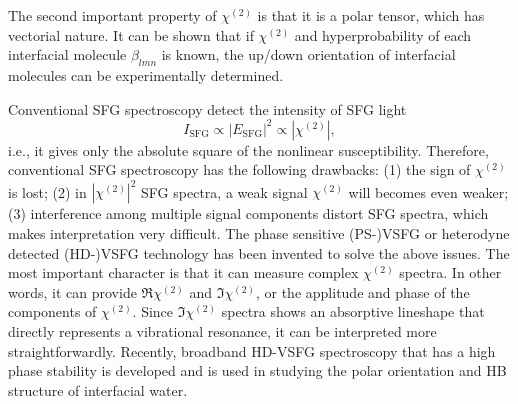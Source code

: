 %
The second important property of $\chi^{(2)}$ is that it is a polar tensor, which has vectorial nature.\cite{Nihonyanagi2013} 
It can be shown that if $\chi^{(2)}$ and hyperprobability of each interfacial molecule $\beta_{lmn}$ is known, 
the up/down orientation of interfacial molecules can be experimentally determined.

Conventional SFG spectroscopy detect the intensity of SFG light
\begin{equation}
I_{\text{SFG}}\propto |E_{\text{SFG}}|^2 \propto |\chi^{(2)}|,
\label{eq:sfg_intensity}
\end{equation}
i.e., it gives only the absolute square of the nonlinear susceptibility. Therefore, conventional SFG spectroscopy has the following drawbacks\cite{Nihonyanagi2013}:
(1) the sign of $\chi^{(2)}$ is lost; 
(2) in $|\chi^{(2)}|^2$ SFG spectra, a weak signal $\chi^{(2)}$  will becomes even weaker;
(3) interference among multiple signal components distort SFG spectra, which makes interpretation very difficult.
The phase sensitive (PS-)VSFG\cite{Ji2008} or heterodyne detected (HD-)VSFG technology has been invented to solve the above 
issues. The most important character is that it can measure complex $\chi^{(2)}$ spectra. In other words, it can provide $\Re \chi^{(2)}$ and $\Im \chi^{(2)}$,
or the applitude and phase of the components of $\chi^{(2)}$. Since $\Im \chi^{(2)}$ spectra shows an absorptive lineshape that directly represents a vibrational resonance, 
it can be interpreted more straightforwardly\cite{Nihonyanagi2013}.
Recently, broadband HD-VSFG spectroscopy that has a high phase stability is developed and is used in studying the polar orientation and HB structure of interfacial
water\cite{Nihonyanagi2009,Shen2013}. 


